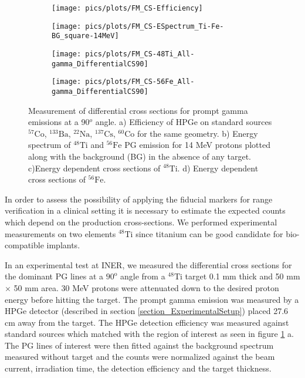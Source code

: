 \documentclass[11pt,a4paper]{article}
\begin{document}
\begin{figure}[h] 
\centering
	\begin{subfigure}[b]{0.49\textwidth} %
	\centering
	\texttt{[image: pics/plots/FM\_CS-Efficiency]}
	\caption{}
	\end{subfigure}
	\hfill
    \hspace{0.00\textwidth} %
	\begin{subfigure}[b]{0.49\textwidth} %
	\centering
	\texttt{[image: pics/plots/FM\_CS-ESpectrum\_Ti-Fe-BG\_square-14MeV]}
	\caption{}
	\end{subfigure}
	\hfill
	\begin{subfigure}[b]{0.49\textwidth} %
	\centering
	\texttt{[image: pics/plots/FM\_CS-48Ti\_All-gamma\_DifferentialCS90]}
	\caption{}
	\end{subfigure} 
	\hfill
	\begin{subfigure}[b]{0.49\textwidth} %
	\centering
	\texttt{[image: pics/plots/FM\_CS-56Fe\_All-gamma\_DifferentialCS90]}
	\caption{}
	\end{subfigure} 
	\hfill
\caption{Measurement of differential cross sections for prompt gamma emissions at a 90$^o$ angle. a) Efficiency of HPGe on standard sources $\mathrm{^{57}Co}$, $\mathrm{^{133}Ba}$, $\mathrm{^{22}Na}$, $\mathrm{^{137}Cs}$, $\mathrm{^{60}Co}$ for the same geometry. b) Energy spectrum of $\mathrm{^{48}Ti}$ and $\mathrm{^{56}Fe}$ PG emission for 14 MeV protons plotted along with the background (BG) in the absence of any target. c)Energy dependent cross sections of $\mathrm{^{48}Ti}$. d) Energy dependent cross sections of $\mathrm{^{56}Fe}$.}
\label{fig_FM_CS}
\end{figure}
In order to assess the possibility of applying the fiducial markers for range verification in a clinical setting it is necessary to estimate the expected counts which depend on the production cross-sections. We performed experimental measurements on two elements $\mathrm{^{48}Ti}$ since titanium can be good candidate for bio-compatible implants. 


In an experimental test at INER, we measured the differential cross sections for the dominant PG lines at a $\mathrm{90^o}$ angle from  a  $\mathrm{^{48}Ti}$ target 0.1 mm thick and  50 mm $\times$ 50 mm area. 30 MeV protons were attenuated down to the desired proton energy before hitting the target. The prompt gamma emission was measured by a HPGe detector (described in section \ref{section_ExperimentalSetup}) placed 27.6 cm away from the target. The HPGe detection efficiency was measured against standard sources which matched with the region of interest as seen in figure \ref{fig_FM_CS} a.  The PG lines of interest were then fitted against the background spectrum measured without target and the counts were normalized against the beam current, irradiation time, the detection efficiency and the target thickness.
\end{document}
